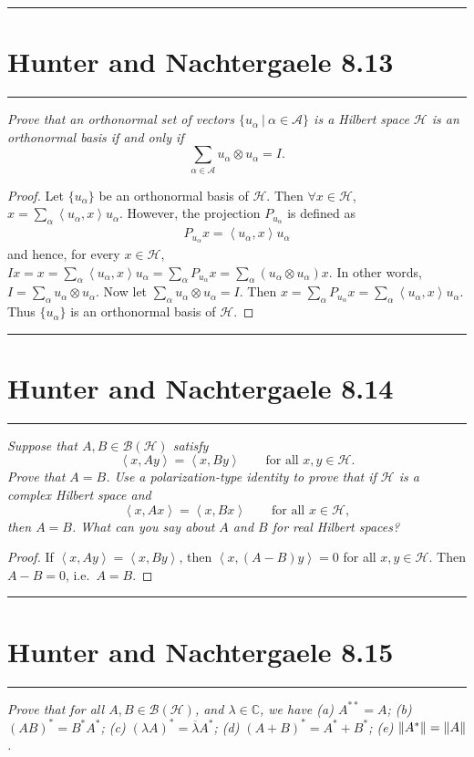 \documentclass{article} %
\theoremstyle{plain}
\def\Cx{\mathbb{C}}
\newcommand{\VEC}[2]{\left\langle #1, #2 \right\rangle}
\newcommand{\Hilb}{\mathcal{H}}
\newcommand{\problem}[1]{
\vspace{.375cm}
\begin{minipage}{\textwidth}
    \begin{center}
        \noindent\rule{5cm}{1pt}
    \end{center}
    \section{\bf #1}
    \begin{center}
        \noindent\rule{5cm}{1pt}
    \end{center}
    \vspace{0.25cm}
\end{minipage}
}
\numberwithin{equation}{section} %
\numberwithin{figure}{section} %
\numberwithin{table}{section} %
\begin{document}
\problem{Hunter and Nachtergaele 8.13}
\emph{Prove that an orthonormal set of vectors $\{u_\alpha\ |\ \alpha \in \mathcal{A}\}$ is a Hilbert space $\Hilb$ is an orthonormal basis if and only if $$\sum_{\alpha \in \mathcal{A}} u_\alpha \otimes u_\alpha = I.$$}

\begin{proof}
    Let $\{u_\alpha\}$ be an orthonormal basis of $\Hilb$.  Then $\forall x \in \Hilb$, $x = \sum_\alpha \VEC{u_\alpha}{x}u_\alpha$.  However, the projection $P_{u_\alpha}$ is defined as
    \begin{align*}
        P_{u_\alpha}x = \VEC{u_\alpha}{x}u_\alpha
    \end{align*}
    and hence, for every $x \in \Hilb$, $I x = x = \sum_\alpha \VEC{u_\alpha}{x}u_\alpha = \sum_\alpha P_{u_\alpha}x = \sum_\alpha (u_\alpha \otimes u_\alpha) x$.  In other words, $I = \sum_\alpha u_\alpha \otimes u_\alpha$.  Now let $\sum_\alpha u_\alpha \otimes u_\alpha = I$.  Then $x = \sum_\alpha P_{u_\alpha}x = \sum_\alpha \VEC{u_\alpha}{x}u_\alpha$.  Thus $\{u_\alpha\}$ is an orthonormal basis of $\Hilb$.
\end{proof}







\problem{Hunter and Nachtergaele 8.14}
\emph{Suppose that $A, B \in \mathcal{B}(\Hilb)$ satisfy $$\VEC{x}{Ay} = \VEC{x}{By} \qquad \text{for all } x, y \in \Hilb.$$  Prove that $A = B$.  Use a polarization-type identity to prove that if $\Hilb$ is a complex Hilbert space and $$\VEC{x}{Ax} = \VEC{x}{Bx} \qquad \text{for all } x \in \Hilb,$$ then $A = B$.  What can you say about $A$ and $B$ for real Hilbert spaces?}

\begin{proof}
    If $\VEC{x}{Ay} = \VEC{x}{By}$, then $\VEC{x}{(A-B)y} = 0$ for all $x, y \in \Hilb$.  Then $A - B = 0$, i.e.~$A = B$.
\end{proof}







\problem{Hunter and Nachtergaele 8.15}
\emph{Prove that for all $A,B \in \mathcal{B}(\Hilb)$, and $\lambda \in \Cx$, we have (a) $A^{**} = A$; (b) $(AB)^* = B^*A^*$; (c) $(\lambda A)^* = \overline{\lambda}A^*$; (d) $(A + B)^* = A^* + B^*$; (e) $\norm{A^*} = \norm{A}$.}
\end{document}
